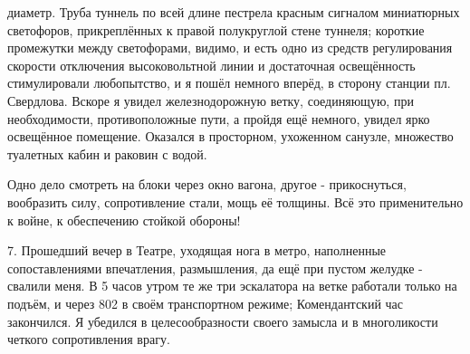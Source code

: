 \label{240-1}
диаметр. Труба туннель по всей длине пестрела красным сигналом миниатюрных светофоров, прикреплённых к правой полукруглой стене туннеля; короткие промежутки между светофорами, видимо, и есть одно из средств регулирования скорости отключения высоковольтной линии и достаточная освещённость стимулировали любопытство, и я пошёл немного вперёд, в сторону станции пл. Свердлова. Вскоре я увидел железнодорожную ветку, соединяющую, при необходимости, противоположные пути, а пройдя ещё немного, увидел ярко освещённое помещение. Оказался в просторном, ухоженном санузле, множество туалетных кабин и раковин с водой.

\label{241-1}
Одно дело смотреть на блоки через окно вагона, другое - прикоснуться, вообразить силу, сопротивление стали, мощь её толщины. Всё это применительно к войне, к обеспечению стойкой обороны!

7. Прошедший вечер в Театре, уходящая нога в метро, наполненные сопоставлениями впечатления, размышления, да ещё при пустом желудке - свалили меня. В 5 часов утром те же три эскалатора на ветке работали только на подъём, и через 802 в своём транспортном режиме; Комендантский час закончился. Я убедился в целесообразности своего замысла и в многоликости четкого сопротивления врагу.

